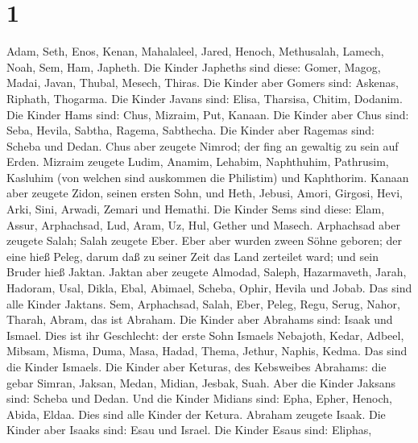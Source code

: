 \hypertarget{section}{%
\section{1}\label{section}}

 Adam, Seth, Enos,  Kenan, Mahalaleel, Jared,
 Henoch, Methusalah, Lamech,  Noah, Sem, Ham,
Japheth.  Die Kinder Japheths sind diese: Gomer, Magog,
Madai, Javan, Thubal, Mesech, Thiras.  Die Kinder aber
Gomers sind: Askenas, Riphath, Thogarma.  Die Kinder Javans
sind: Elisa, Tharsisa, Chitim, Dodanim.  Die Kinder Hams
sind: Chus, Mizraim, Put, Kanaan.  Die Kinder aber Chus
sind: Seba, Hevila, Sabtha, Ragema, Sabthecha. Die Kinder aber Ragemas
sind: Scheba und Dedan.  Chus aber zeugete Nimrod; der fing
an gewaltig zu sein auf Erden.  Mizraim zeugete Ludim,
Anamim, Lehabim, Naphthuhim,  Pathrusim, Kasluhim (von
welchen sind auskommen die Philistim) und Kaphthorim. 
Kanaan aber zeugete Zidon, seinen ersten Sohn, und Heth, 
Jebusi, Amori, Girgosi,  Hevi, Arki, Sini, 
Arwadi, Zemari und Hemathi.  Die Kinder Sems sind diese:
Elam, Assur, Arphachsad, Lud, Aram, Uz, Hul, Gether und Masech.
 Arphachsad aber zeugete Salah; Salah zeugete Eber.
 Eber aber wurden zween Söhne geboren; der eine hieß Peleg,
darum daß zu seiner Zeit das Land zerteilet ward; und sein Bruder hieß
Jaktan.  Jaktan aber zeugete Almodad, Saleph, Hazarmaveth,
Jarah,  Hadoram, Usal, Dikla,  Ebal, Abimael,
Scheba,  Ophir, Hevila und Jobab. Das sind alle Kinder
Jaktans.  Sem, Arphachsad, Salah,  Eber,
Peleg, Regu,  Serug, Nahor, Tharah,  Abram,
das ist Abraham.  Die Kinder aber Abrahams sind: Isaak und
Ismael.  Dies ist ihr Geschlecht: der erste Sohn Ismaels
Nebajoth, Kedar, Adbeel, Mibsam,  Misma, Duma, Masa, Hadad,
Thema,  Jethur, Naphis, Kedma. Das sind die Kinder Ismaels.
 Die Kinder aber Keturas, des Kebsweibes Abrahams: die
gebar Simran, Jaksan, Medan, Midian, Jesbak, Suah. Aber die Kinder
Jaksans sind: Scheba und Dedan.  Und die Kinder Midians
sind: Epha, Epher, Henoch, Abida, Eldaa. Dies sind alle Kinder der
Ketura.  Abraham zeugete Isaak. Die Kinder aber Isaaks
sind: Esau und Israel.  Die Kinder Esaus sind: Eliphas,
